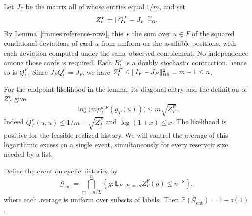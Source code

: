Let $J_F$ be the matrix all of whose entries equal $1/m$, and set
\[
 Z_t^F=\|Q_t^F-J_F\|_{\rm HS}^2.
\]
By Lemma~\ref{frames:reference-rows}, this is the sum over $u\in F$ of
the squared conditional deviations of card $u$ from uniform on the
available positions, with each deviation computed under the same
observed complement. No independence among those cards is required.
Each $B_t^F$ is a doubly stochastic contraction, hence so is $Q_t^F$.
Since $J_FQ_t^F=J_F$, we have
$Z_t^F\le\|I_F-J_F\|_{\rm HS}^2=m-1\le n$.

For the endpoint likelihood in the lemma, its diagonal entry and the
definition of $Z_T^F$ give
\begin{equation}
 \log\bigl(m p_T^{u,F}(g_T(u))\bigr)
 \le m\sqrt{Z_T^F}.
 \label{frames:likelihood-excess}
\end{equation}
Indeed $Q_T^F(u,u)\le1/m+\sqrt{Z_T^F}$ and
$\log(1+x)\le x$. The likelihood is positive for the feasible realized
history. We will control the average of this logarithmic excess on a
single event, simultaneously for every reservoir size needed by a list.

\begin{lemma}
\label{frames:typical-history}
Define the event on cyclic histories by
\begin{equation}\label{frames:typical-average}
 \mathcal G_{\mathrm{ent}}
 =\bigcap_{m=n/L}^{n}
   \left\{g:\mathbb E_{F:\,|F|=m}Z_T^F(g)\le n^{-8}\right\},
\end{equation}
where each average is uniform over subsets of labels. Then
$\mathbb P(\mathcal G_{\mathrm{ent}})=1-o(1)$.
\end{lemma}

